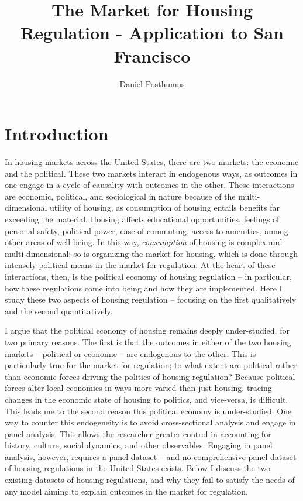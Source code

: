 \documentclass{article}
\title{The Market for Housing Regulation - Application to San Francisco}
\author{Daniel Posthumus}
\begin{document}
\maketitle

\tableofcontents

\clearpage

\section{Introduction}

In housing markets across the United States, there are two markets: the economic and the political. These two markets interact in endogenous ways, as outcomes in one engage in a cycle of causality with outcomes in the other. These interactions are economic, political, and sociological in nature because of the multi-dimensional utility of housing, as consumption of housing entails benefits far exceeding the material. Housing affects educational opportunities, feelings of personal safety, political power, ease of commuting, access to amenities, among other areas of well-being. In this way, \textit{consumption} of housing is complex and multi-dimensional; so is organizing the market for housing, which is done through intensely political means in the market for regulation. At the heart of these interactions, then, is the political economy of housing regulation -- in particular, how these regulations come into being and how they are implemented. Here I study these two aspects of housing regulation -- focusing on the first qualitatively and the second quantitatively.

I argue that the political economy of housing remains deeply under-studied, for two primary reasons. The first is that the outcomes in either of the two housing markets -- political or economic -- are endogenous to the other. This is particularly true for the market for regulation; to what extent are political rather than economic forces driving the politics of housing regulation? Because political forces alter local economies in ways more varied than just housing, tracing changes in the economic state of housing to politics, and vice-versa, is difficult. This leads me to the second reason this political economy is under-studied. One way to counter this endogeneity is to avoid cross-sectional analysis and engage in panel analysis. This allows the researcher greater control in accounting for history, culture, social dynamics, and other observables. Engaging in panel analysis, however, requires a panel dataset -- and no comprehensive panel dataset of housing regulations in the United States exists. Below I discuss the two existing datasets of housing regulations, and why they fail to satisfy the needs of any model aiming to explain outcomes in the market for regulation.
\end{document}
